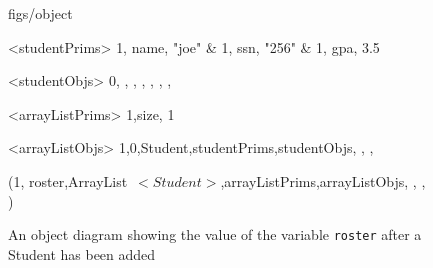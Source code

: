 





\begin {figure}


\Draw

 {figs/object}


\Indirect \Table <studentPrims>
{ 1, name, "joe" &
  1, ssn, "256"  &
  1, gpa, 3.5  
}

\Indirect \Table <studentObjs>
{ 0,  ,  ,  , , , ,  }

\Indirect \Table <arrayListPrims>
{1,size, 1}


\Indirect \Table <arrayListObjs>
 {  1,0,Student,studentPrims,studentObjs, , ,  }
  


\Obj (1, roster,ArrayList~$<Student>$,arrayListPrims,arrayListObjs, , , )
    
\EndDraw

\caption {An object diagram showing the value of the
variable \texttt {roster} after a Student has been
added}

\label {fig:ArrayList1}

\end {figure}


